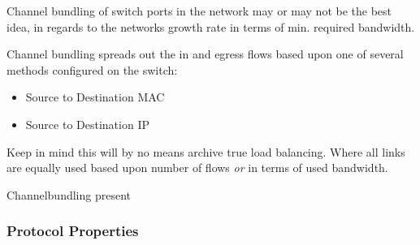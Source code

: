 Channel bundling of switch ports in the network may or may not be the best idea, in regards to the networks growth rate in terms of min. required bandwidth.

Channel bundling spreads out the in and egress flows based upon one of several methods configured on the switch:
\begin{itemize}
    \item Source to Destination MAC
    \item Source to Destination IP
\end{itemize}
Keep in mind this will by no means archive true load balancing. Where all links are equally used based upon number of flows \textit{or} in terms of used bandwidth.

\begin{table}[h]
    \centering
    \caption{Channel bundling mechanisms}
    \label{chbundmech1}
\end{table}

%
{Channelbundling present}

\subsubsection{Protocol Properties}

